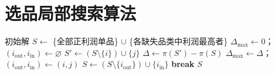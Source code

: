 \documentclass[12pt]{ctexart}
\begin{document}
\section{选品局部搜索算法}
\begin{algorithm}[htbp]
\caption{品类覆盖约束下的选品局部搜索}
\begin{algorithmic}[1]
\State 初始解 $S \gets$ \{全部正利润单品\} $\cup$ \{各缺失品类中利润最高者\}
    \State $\Delta_{\max} \gets 0$；$(i_{\mathrm{out}},i_{\mathrm{in}})\gets \varnothing$
            \State $S' \gets (S\setminus\{i\})\cup\{j\}$
                \State $\Delta \gets \pi(S')-\pi(S)$
                \If{$\Delta>\Delta_{\max}$}
                    \State $\Delta_{\max}\gets\Delta$；$(i_{\mathrm{out}},i_{\mathrm{in}})\gets(i,j)$
                \EndIf
            \EndIf
        \EndFor
    \EndFor
        \State $S \gets (S\setminus\{i_{\mathrm{out}}\})\cup\{i_{\mathrm{in}}\}$
    \Else
        \State \textbf{break}
    \EndIf
\EndWhile
\State \Return $S$
\end{algorithmic}
\end{algorithm}
\end{document}
